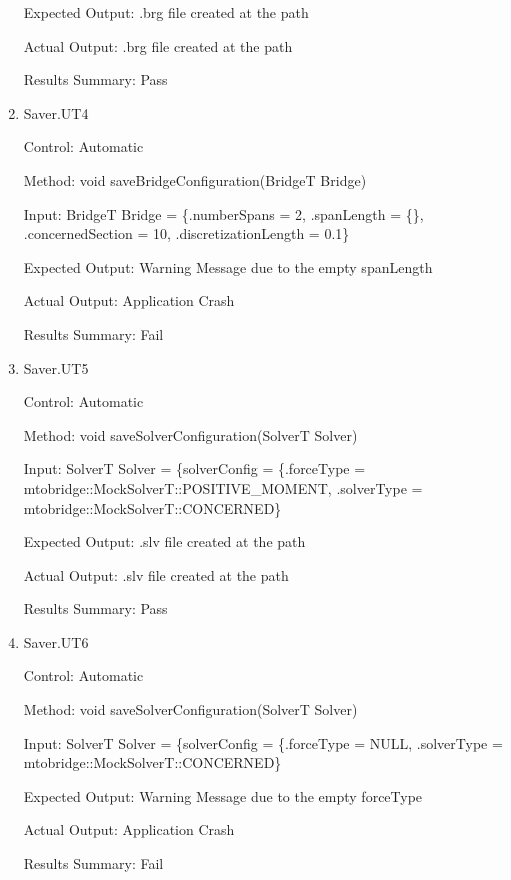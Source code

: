 \documentclass[12pt, titlepage]{article}
\begin{document}
\begin{enumerate}
    Expected Output: .brg file created at the path

    Actual Output: .brg file created at the path

    Results Summary: Pass

    \item{Saver.UT4\\}
    
    Control: Automatic
    
    Method:  void saveBridgeConfiguration(BridgeT Bridge)
    
    Input: BridgeT Bridge = \{.numberSpans = 2,
                         .spanLength = \{\},
                         .concernedSection = 10,
                         .discretizationLength = 0.1\}
    
    Expected Output: Warning Message due to the empty spanLength

    Actual Output: Application Crash

    Results Summary: Fail

    \item{Saver.UT5\\}
    
    Control: Automatic
    
    Method:  void saveSolverConfiguration(SolverT Solver)
    
    Input: SolverT Solver = \{solverConfig = \{.forceType = mtobridge::MockSolverT::POSITIVE\_MOMENT,
                         .solverType = mtobridge::MockSolverT::CONCERNED\}
    
    Expected Output: .slv file created at the path

    Actual Output: .slv file created at the path

    Results Summary: Pass

    \item{Saver.UT6\\}
    
    Control: Automatic
    
    Method:  void saveSolverConfiguration(SolverT Solver)
    
    Input: SolverT Solver = \{solverConfig = \{.forceType = NULL,
                         .solverType = mtobridge::MockSolverT::CONCERNED\}
    
    Expected Output: Warning Message due to the empty forceType

    Actual Output: Application Crash

    Results Summary: Fail
    
\end{enumerate}
\end{document}
